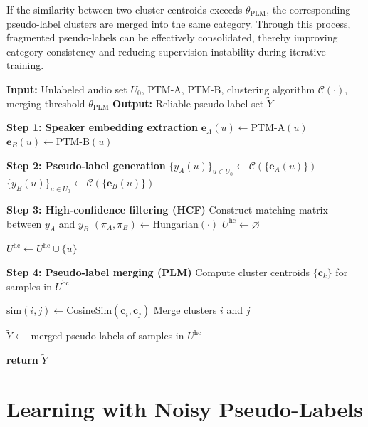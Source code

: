 \documentclass[lettersize,journal]{IEEEtran}
\begin{document}
If the similarity between two cluster centroids exceeds $\theta_{\mathrm{PLM}}$, the corresponding pseudo-label clusters are merged into the same category. Through this process, fragmented pseudo-labels can be effectively consolidated, thereby improving category consistency and reducing supervision instability during iterative training.
\begin{algorithm}[t]
\caption{\textbf{HCPL:} High-Confidence Pseudo-Label Generation Framework}
\label{alg:alg1}
\begin{algorithmic}
\STATE
\STATE \textbf{Input:} Unlabeled audio set $U_0$, PTM-A, PTM-B, clustering algorithm $\mathcal{C}(\cdot)$, merging threshold $\theta_{\mathrm{PLM}}$
\STATE \textbf{Output:} Reliable pseudo-label set $\tilde{Y}$

\STATE \textbf{Step 1: Speaker embedding extraction}
    \STATE $\mathbf{e}_A(u)\gets \mathrm{PTM\mbox{-}A}(u)$
    \STATE $\mathbf{e}_B(u)\gets \mathrm{PTM\mbox{-}B}(u)$
\ENDFOR

\STATE \textbf{Step 2: Pseudo-label generation}
\STATE $\{y_A(u)\}_{u\in U_0}\gets \mathcal{C}(\{\mathbf{e}_A(u)\})$
\STATE $\{y_B(u)\}_{u\in U_0}\gets \mathcal{C}(\{\mathbf{e}_B(u)\})$

\STATE \textbf{Step 3: High-confidence filtering (HCF)}
\STATE Construct matching matrix between $y_A$ and $y_B$
\STATE $(\pi_A,\pi_B)\gets \mathrm{Hungarian}(\cdot)$
\STATE $U^{\mathrm{hc}}\gets\varnothing$

        \STATE $U^{\mathrm{hc}}\gets U^{\mathrm{hc}}\cup\{u\}$
    \ENDIF
\ENDFOR

\STATE \textbf{Step 4: Pseudo-label merging (PLM)}
\STATE Compute cluster centroids $\{\mathbf{c}_k\}$ for samples in $U^{\mathrm{hc}}$

    \STATE $\mathrm{sim}(i,j)\gets \mathrm{CosineSim}(\mathbf{c}_i,\mathbf{c}_j)$
        \STATE Merge clusters $i$ and $j$
    \ENDIF
\ENDFOR

\STATE $\tilde{Y}\gets$ merged pseudo-labels of samples in $U^{\mathrm{hc}}$

\STATE \textbf{return} $\tilde{Y}$

\end{algorithmic}
\end{algorithm}
\section{Learning with Noisy Pseudo-Labels}
\end{document}

